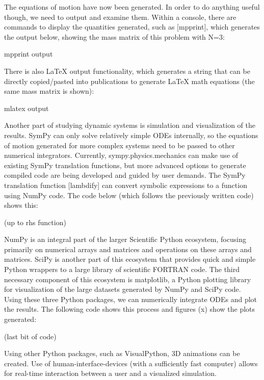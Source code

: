 \documentclass[twocolumn,10pt]{asme2e}
\begin{document}
The equations of motion have now been generated.
In order to do anything useful though, we need to output and examine them.
Within a console, there are commands to display the quantities generated, such
as [mpprint], which generates the output below, showing the mass matrix of this
problem with N=3:

mpprint output

There is also LaTeX output functionality, which generates a string that can be
directly copied/pasted into publications to generate LaTeX math equations (the
same mass matrix is shown):

mlatex output

Another part of studying dynamic systems is simulation and visualization of the
results.
SymPy can only solve relatively simple ODEs internally, so the equations of
motion generated for more complex systems need to be passed to other numerical
integrators.
Currently, sympy.physics.mechanics can make use of existing SymPy translation
functions, but more advanced options to generate compiled code are being
developed and guided by user demands.
The SymPy translation function [lambdify] can convert symbolic expressions to a
function using NumPy code.
The code below (which follows the previously written code) shows this:

(up to rhs function)

NumPy is an integral part of the larger Scientific Python ecosystem, focusing
primarily on numerical arrays and matrices and operations on these arrays and
matrices.
SciPy is another part of this ecosystem that provides quick and simple Python
wrappers to a large library of scientific FORTRAN code.
The third necessary component of this ecosystem is matplotlib, a Python
plotting library for visualization of the large datasets generated by NumPy and
SciPy code.
Using these three Python packages, we can numerically integrate ODEs and plot
the results.
The following code shows this process and figures (x) show the plots generated:

(last bit of code)

Using other Python packages, such as VisualPython, 3D animations can be
created.
Use of human-interface-devices (with a sufficiently fast computer) allows for
real-time interaction between a user and a visualized simulation.
\end{document}
